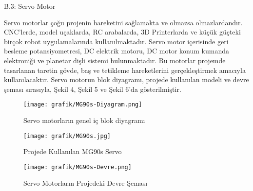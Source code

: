 B.3: Servo Motor
\label{DorduncuBolum}

	Servo motorlar çoğu projenin hareketini sağlamakta ve olmazsa olmazlardandır. CNC'lerde, model uçaklarda, RC arabalarda, 3D Printerlarda ve küçük güçteki birçok robot uygulamalarında kullanılmaktadır. Servo motor içerisinde geri besleme potansiyometresi, DC elektrik motoru, DC motor konum kumanda elektroniği ve planetar dişli sistemi bulunmaktadır. Bu motorlar projemde tasarlanan taretin gövde, baş ve tetikleme hareketlerini gerçekleştirmek amacıyla kullanılacaktır. Servo motorun blok diyagramı, projede kullanılan modeli ve devre şeması sırasıyla, Şekil 4, Şekil 5 ve Şekil 6’da gösterilmiştir.

\begin{figure}[H]
	\centering
	\texttt{[image: grafik/MG90s-Diyagram.png]}
    \caption{Servo motorların genel iç blok diyagramı}
	\label{fig:MG90s-DiyagramDM}
\end{figure}
\begin{figure}[H]
	\centering
	\texttt{[image: grafik/MG90s.jpg]}
    \caption{Projede Kullanılan MG90s Servo}
	\label{fig:MG90sDM}
\end{figure}
\begin{figure}[H]
	\centering
	\texttt{[image: grafik/MG90s-Devre.png]}
    \caption{Servo Motorların Projedeki Devre Şeması}
	\label{fig:MG90s-DevreDM}
\end{figure}

\clearpage